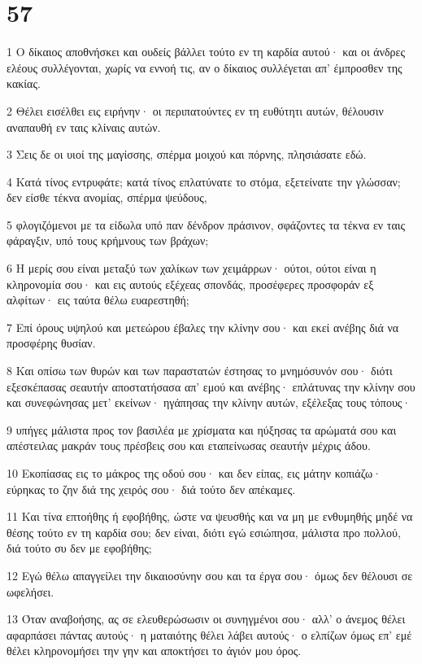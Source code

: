 \chapter{57}

\par 1 Ο δίκαιος αποθνήσκει και ουδείς βάλλει τούτο εν τη καρδία αυτού· και οι άνδρες ελέους συλλέγονται, χωρίς να εννοή τις, αν ο δίκαιος συλλέγεται απ' έμπροσθεν της κακίας.
\par 2 Θέλει εισέλθει εις ειρήνην· οι περιπατούντες εν τη ευθύτητι αυτών, θέλουσιν αναπαυθή εν ταις κλίναις αυτών.
\par 3 Σεις δε οι υιοί της μαγίσσης, σπέρμα μοιχού και πόρνης, πλησιάσατε εδώ.
\par 4 Κατά τίνος εντρυφάτε; κατά τίνος επλατύνατε το στόμα, εξετείνατε την γλώσσαν; δεν είσθε τέκνα ανομίας, σπέρμα ψεύδους,
\par 5 φλογιζόμενοι με τα είδωλα υπό παν δένδρον πράσινον, σφάζοντες τα τέκνα εν ταις φάραγξιν, υπό τους κρήμνους των βράχων;
\par 6 Η μερίς σου είναι μεταξύ των χαλίκων των χειμάρρων· ούτοι, ούτοι είναι η κληρονομία σου· και εις αυτούς εξέχεας σπονδάς, προσέφερες προσφοράν εξ αλφίτων· εις ταύτα θέλω ευαρεστηθή;
\par 7 Επί όρους υψηλού και μετεώρου έβαλες την κλίνην σου· και εκεί ανέβης διά να προσφέρης θυσίαν.
\par 8 Και οπίσω των θυρών και των παραστατών έστησας το μνημόσυνόν σου· διότι εξεσκέπασας σεαυτήν αποστατήσασα απ' εμού και ανέβης· επλάτυνας την κλίνην σου και συνεφώνησας μετ' εκείνων· ηγάπησας την κλίνην αυτών, εξέλεξας τους τόπους·
\par 9 υπήγες μάλιστα προς τον βασιλέα με χρίσματα και ηύξησας τα αρώματά σου και απέστειλας μακράν τους πρέσβεις σου και εταπείνωσας σεαυτήν μέχρις άδου.
\par 10 Εκοπίασας εις το μάκρος της οδού σου· και δεν είπας, εις μάτην κοπιάζω· εύρηκας το ζην διά της χειρός σου· διά τούτο δεν απέκαμες.
\par 11 Και τίνα επτοήθης ή εφοβήθης, ώστε να ψευσθής και να μη με ενθυμηθής μηδέ να θέσης τούτο εν τη καρδία σου; δεν είναι, διότι εγώ εσιώπησα, μάλιστα προ πολλού, διά τούτο συ δεν με εφοβήθης;
\par 12 Εγώ θέλω απαγγείλει την δικαιοσύνην σου και τα έργα σου· όμως δεν θέλουσι σε ωφελήσει.
\par 13 Όταν αναβοήσης, ας σε ελευθερώσωσιν οι συνηγμένοι σου· αλλ' ο άνεμος θέλει αφαρπάσει πάντας αυτούς· η ματαιότης θέλει λάβει αυτούς· ο ελπίζων όμως επ' εμέ θέλει κληρονομήσει την γην και αποκτήσει το άγιόν μου όρος.
